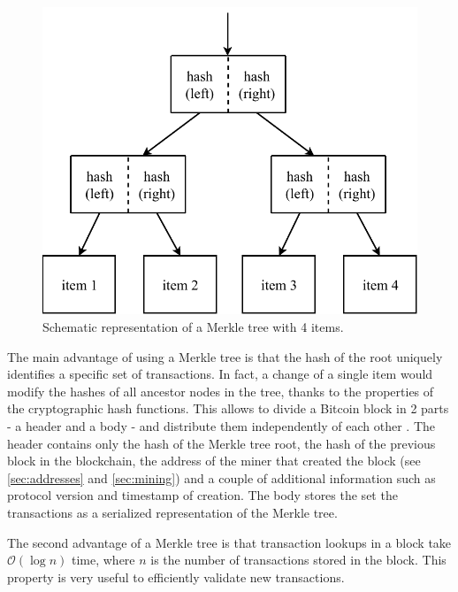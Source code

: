 \begin{figure}[ht]
	\centering
	\vspace*{0.1cm}
	\includegraphics[scale=0.7]{figures/merkle}
	\vspace*{0.25cm}
	\caption[Schematic representation of a Merkle tree]{Schematic representation of a Merkle tree with \num{4} items.}
	\label{fig:merkle}
\end{figure}

The main advantage of using a Merkle tree is that the hash of the root uniquely identifies a specific set of transactions.
In fact, a change of a single item would modify the hashes of all ancestor nodes in the tree, thanks to the properties of the cryptographic hash functions.
This allows to divide a Bitcoin block in \num{2} parts - a header and a body - and distribute them independently of each other \cite{bitcoin_reference}.
The header contains only the hash of the Merkle tree root, the hash of the previous block in the blockchain, the address of the miner that created the block (see \cref{sec:addresses} and \cref{sec:mining}) and a couple of additional information such as protocol version and timestamp of creation.
The body stores the set the transactions as a serialized representation of the Merkle tree.

The second advantage of a Merkle tree is that transaction lookups in a block take $\mathcal{O}(\log n)$ time, where $n$ is the number of transactions stored in the block.
This property is very useful to efficiently validate new transactions.

